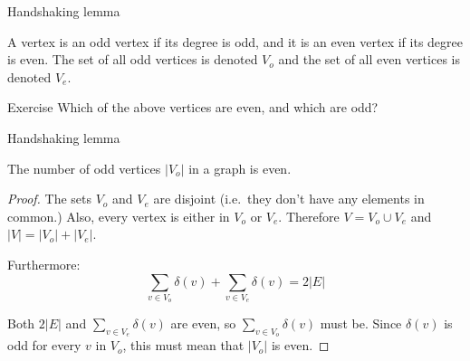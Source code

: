 \begin{frame}{Handshaking lemma}
	\begin{definition}
		A vertex is an odd vertex if its degree is odd, and it is an even vertex if its degree is even.
		The set of all odd vertices is denoted $V_o$ and the set of all even vertices is denoted $V_e$.
	\end{definition}
	\begin{center}
	\end{center}
	\begin{block}{Exercise}
		Which of the above vertices are even, and which are odd?
	\end{block}
\end{frame}

\begin{frame}{Handshaking lemma}

	\begin{lemma}
		The number of odd vertices $| V_o |$ in a graph is even.
	\end{lemma}

	\begin{proof}
		The sets $V_o$ and $V_e$ are disjoint (i.e.\ they don't have any elements in common.)
		Also, every vertex is either in $V_o$ or $V_e$.
		Therefore $V = V_o \cup V_e$ and $|V| = |V_o| + |V_e|$.
		
		Furthermore:
			\[ \sum_{v \in V_o} \delta(v) + \sum_{v \in V_e} \delta(v) = 2 |E| \]

		Both $2|E|$ and $\sum_{v \in V_e} \delta(v)$ are even, so $\sum_{v \in V_o} \delta(v)$ must be.
		Since $\delta(v)$ is odd for every $v$ in $V_o$, this must mean that $|V_o|$ is even.
	\end{proof}

\end{frame}


